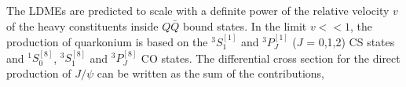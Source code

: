 \documentclass[aps,prc,preprint,superscriptaddress,showpacs,showkeys,amsmath]{revtex4-1}
\begin{document}
The LDMEs are predicted to scale with a definite power of the relative velocity $v$ of the heavy constituents inside $Q\bar Q$ bound states. 
In the limit $v<<1$, the production of quarkonium is based on the $^3S_1^{[1]}$ and $^3P_J^{[1]}$ ($J$ = 0,1,2) CS states 
and $^1S_0^{[8]}$, $^3S_1^{[8]}$ and $^3P_J^{[8]}$ CO states.
The differential cross section for the direct production of $J/\psi$ can be written 
as the sum of the contributions,
\end{document}
